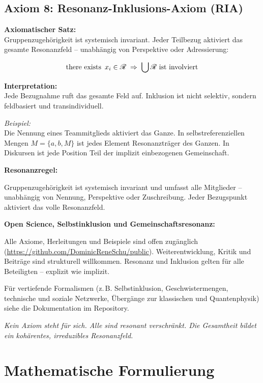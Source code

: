 \documentclass[12pt]{iopart}
\providecommand{\mathcal}[1]{\mathscr{#1}}
\providecommand{\text}[1]{\mbox{#1}}
\providecommand{\exists}{\hbox{there exists }}
\begin{document}
\newpage

\subsection{Axiom 8: Resonanz-Inklusions-Axiom (RIA)}

\textbf{Axiomatischer Satz:}\\
Gruppenzugehörigkeit ist systemisch invariant. Jeder Teilbezug aktiviert das gesamte Resonanzfeld – unabhängig von Perspektive oder Adressierung:

$$
\exists\, x_i \in \mathcal{R} \;\Rightarrow\; \bigcup \mathcal{R} \text{ ist involviert}
$$

\textbf{Interpretation:}\\
Jede Bezugnahme ruft das gesamte Feld auf. Inklusion ist nicht selektiv, sondern feldbasiert und transindividuell.

\textit{Beispiel:}\\
Die Nennung eines Teammitglieds aktiviert das Ganze. In selbstreferenziellen Mengen $M = \{a, b, M\}$ ist jedes Element Resonanzträger des Ganzen. In Diskursen ist jede Position Teil der implizit einbezogenen Gemeinschaft.

\bigskip

\noindent
\textbf{Resonanzregel:}

Gruppenzugehörigkeit ist systemisch invariant und umfasst alle Mitglieder – unabhängig von Nennung, Perspektive oder Zuschreibung. Jeder Bezugspunkt aktiviert das volle Resonanzfeld.

\bigskip

\noindent
\textbf{Open Science, Selbstinklusion und Gemeinschaftsresonanz:}

Alle Axiome, Herleitungen und Beispiele sind offen zugänglich (\url{https://github.com/DominicReneSchu/public}). Weiterentwicklung, Kritik und Beiträge sind strukturell willkommen. Resonanz und Inklusion gelten für alle Beteiligten – explizit wie implizit.

\bigskip

Für vertiefende Formalismen (z. B. Selbstinklusion, Geschwistermengen, technische und soziale Netzwerke, Übergänge zur klassischen und Quantenphysik) siehe die Dokumentation im Repository.

\bigskip

\textit{Kein Axiom steht für sich. Alle sind resonant verschränkt. Die Gesamtheit bildet ein kohärentes, irreduzibles Resonanzfeld.}
	
\section{Mathematische Formulierung}
\end{document}
